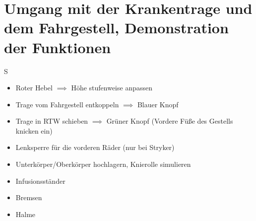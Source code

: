 \chapter{Umgang mit der Krankentrage und dem Fahrgestell, Demonstration der Funktionen}S
\begin{itemize}
    \item Roter Hebel $\implies$ Höhe stufenweise anpassen
    \item Trage vom Fahrgestell entkoppeln $\implies$ Blauer Knopf
    \item Trage in RTW schieben $\implies$ Grüner Knopf (Vordere Füße des Gestells knicken ein)
    \item Lenksperre für die vorderen Räder (nur bei Stryker)
    \item Unterkörper/Oberkörper hochlagern, Knierolle simulieren
    \item Infusionsständer
    \item Bremsen
    \item Halme
\end{itemize}